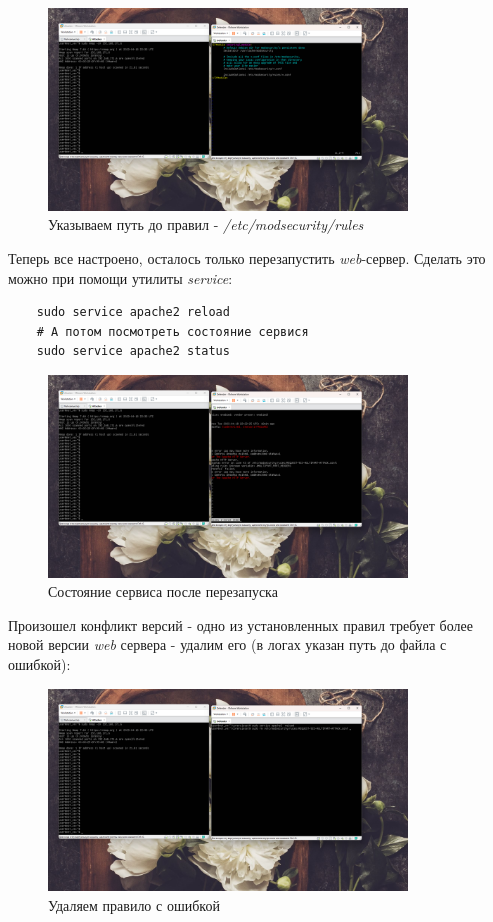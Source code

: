 \documentclass[a4paper]{article}
\begin{document}
  \begin{figure}[H]
    \centering
    \includegraphics[width=0.85\textwidth]{03_00 (60)}
    \caption{Указываем путь до правил - \textit{/etc/modsecurity/rules}}
    \label{img:60}
  \end{figure}

  Теперь все настроено, осталось только перезапустить \textit{web}-сервер.
  Сделать это можно при помощи утилиты \textit{service}:
  \begin{verbatim}
    sudo service apache2 reload
    # А потом посмотреть состояние сервися
    sudo service apache2 status
  \end{verbatim}

  \begin{figure}[H]
    \centering
    \includegraphics[width=0.85\textwidth]{03_00 (63)}
    \caption{Состояние сервиса после перезапуска}
    \label{img:63}
  \end{figure}

  Произошел конфликт версий - одно из установленных правил
  требует более новой версии \textit{web} сервера - удалим его (в логах указан путь до файла с ошибкой):

  \begin{figure}[H]
    \centering
    \includegraphics[width=0.85\textwidth]{03_00 (64)}
    \caption{Удаляем правило с ошибкой}
    \label{img:64}
  \end{figure}
\end{document}
